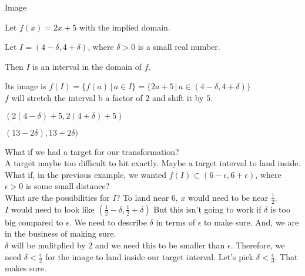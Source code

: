 \documentclass{ximera}
\begin{document}
\begin{example} Image

Let $f(x) = 2x + 5$ with the implied domain.

Let  $I = (4-\delta, 4+\delta)$, where $\delta > 0$ is a small real number.

Then $I$ is an interval in the domain of $f$.


Its image is $f(I) = \{   f(a)  \, | \, a \in I \}  = \{   2a+5  \, | \, a \in (4-\delta, 4+\delta) \}$  \\



$f$ will stretch the interval b a factor of $2$ and shift it by $5$.


$(2(4-\delta)+5, 2(4+\delta)+5)$


$(13-2\delta), 13+2\delta)$






\end{example}





What if we had a target for our transformation? \\

A target maybe too difficult to hit exactly.  Maybe a target interval to land inside. \\



What if, in the previous example, we wanted $f(I) \subset (6-\epsilon, 6+\epsilon)$, where $\epsilon > 0$ is some small distance?  \\


What are the possibilities for $I$?  To land near $6$, $x$ would need to be near $\frac{1}{2}$.  \\

$I$ would need to look like $\left( \frac{1}{2} - \delta, \frac{1}{2}+ \delta \right)$  But this isn't going to work if $\delta$ is too big compared to $\epsilon$.  We need to describe $\delta$ in terms of $\epsilon$ to make sure.  And, we are in the business of making sure. \\



$\delta$ will be mulitplied by $2$ and we need this to be smaller than $\epsilon$.  Therefore, we need $\delta < \frac{\epsilon}{2}$ for the image to land inside our target interval.  Let's pick $\delta < \frac{\epsilon}{3}$.  That makes sure. \\
\end{document}
